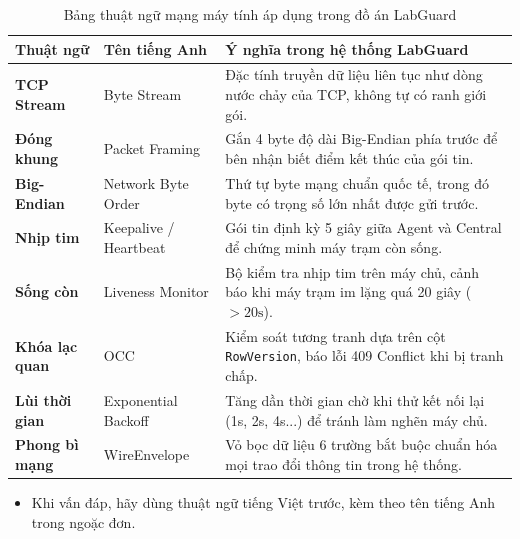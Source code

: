 \documentclass[12pt,a4paper]{article}
\begin{document}
\begin{table}[H]
  \centering
  \caption{Bảng thuật ngữ mạng máy tính áp dụng trong đồ án LabGuard}
  \label{tab:glossary}
  \small
  \begin{tabularx}{\textwidth}{|l|l|X|}
    \hline
    \rowcolor{lgDeepBlue}
    \color{white}\textbf{Thuật ngữ} & \color{white}\textbf{Tên tiếng Anh} & \color{white}\textbf{Ý nghĩa trong hệ thống LabGuard} \\
    \hline
    \textbf{TCP Stream} & Byte Stream & Đặc tính truyền dữ liệu liên tục như dòng nước chảy của TCP, không tự có ranh giới gói. \\
    \hline
    \textbf{Đóng khung} & Packet Framing & Gắn 4 byte độ dài Big-Endian phía trước để bên nhận biết điểm kết thúc của gói tin. \\
    \hline
    \textbf{Big-Endian} & Network Byte Order & Thứ tự byte mạng chuẩn quốc tế, trong đó byte có trọng số lớn nhất được gửi trước. \\
    \hline
    \textbf{Nhịp tim} & Keepalive / Heartbeat & Gói tin định kỳ 5 giây giữa Agent và Central để chứng minh máy trạm còn sống. \\
    \hline
    \textbf{Sống còn} & Liveness Monitor & Bộ kiểm tra nhịp tim trên máy chủ, cảnh báo khi máy trạm im lặng quá 20 giây ($> 20\text{s}$). \\
    \hline
    \textbf{Khóa lạc quan} & OCC & Kiểm soát tương tranh dựa trên cột \texttt{RowVersion}, báo lỗi 409 Conflict khi bị tranh chấp. \\
    \hline
    \textbf{Lùi thời gian} & Exponential Backoff & Tăng dần thời gian chờ khi thử kết nối lại (1s, 2s, 4s...) để tránh làm nghẽn máy chủ. \\
    \hline
    \textbf{Phong bì mạng} & WireEnvelope & Vỏ bọc dữ liệu 6 trường bắt buộc chuẩn hóa mọi trao đổi thông tin trong hệ thống. \\
    \hline
  \end{tabularx}
\end{table}

\begin{takeawaybox}
\begin{itemize}[leftmargin=1.5em, itemsep=1pt]
  \item Khi vấn đáp, hãy dùng thuật ngữ tiếng Việt trước, kèm theo tên tiếng Anh trong ngoặc đơn.
\end{itemize}
\end{takeawaybox}

\end{document}
